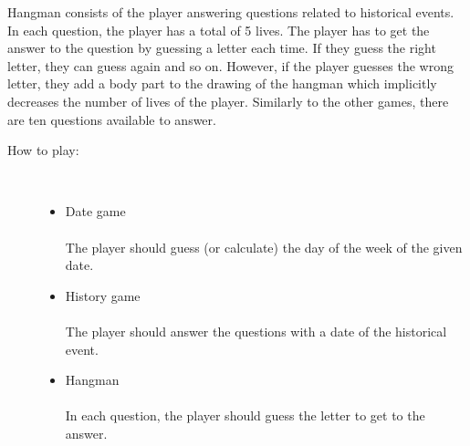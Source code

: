\documentclass[11pt]{article}
\begin{document}
    Hangman consists of the player answering questions related to historical
     events. In each question, the player has a total of 5 lives. The player
      has to get the answer to the question by guessing a letter each time. If
      they guess the right letter, they can guess again and so on. However, if
      the player guesses the wrong letter, they add a body part to the drawing
      of the hangman which implicitly decreases the number of lives of the
      player. Similarly to the other games, there are ten questions available
       to answer.\\

    \begin{description}
    \item[How to play:] \hfill \\
        \begin{itemize}
            \item Date game \\\\
            The player should guess (or calculate) the day of the week of the
            given date.\\
            \item History game \\\\
            The player should answer the questions with a date of the historical
             event.\\
            \item Hangman \\\\
            In each question, the player should guess the letter to get to the
            answer.\\
        \end{itemize}


\end{description}
\end{document}
